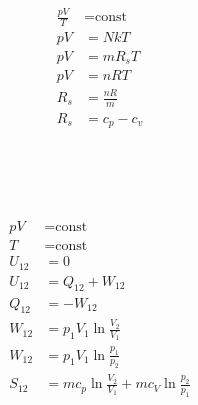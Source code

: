 \begin{boxleft}
\\
\\
\\
\\
\\
\\
\\
\\
\end{boxleft}\begin{boxrightshaded}
\begin{align*}
\frac{pV}{T}&=\text{const}\\
pV&=NkT\\
pV&=mR_sT\\
pV&=nRT\\
R_s&=\frac{nR}{m}\\
R_s&=c_p-c_v
\end{align*}
\end{boxrightshaded}


\begin{boxleft}
\\
\\
\\
\end{boxleft}\begin{boxrightshaded}
\begin{align*}
pV&=\text{const}\\
T&=\text{const}\\
U_{12}&=0\\
U_{12}&=Q_{12}+ W_{12}\\
Q_{12}&=-W_{12}\\
W_{12}&=p_1V_1\ln{\frac{V_2}{V_1}}\\
W_{12}&=p_1V_1\ln{\frac{p_1}{p_2}}\\
S_{12}&=mc_p\ln{\frac{V_2}{V_1}}+mc_V\ln{\frac{p_2}{p_1}}
\end{align*}
\end{boxrightshaded}

